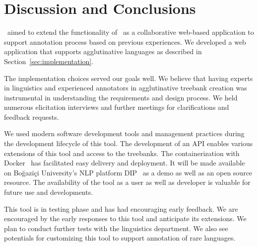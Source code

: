 \section{Discussion and Conclusions}
\label{sec:discussion}

\boatvtwo\ aimed to  extend the functionality of \boatvone\ as a collaborative web-based application to support annotation process based on previous experiences. 
We developed a web application that supports agglutinative languages as described in Section~\ref{sec:implementation}. 

The implementation choices served our goals well. 
We believe that having experts in linguistics and experienced annotators in agglutinative treebank creation was instrumental in understanding the requirements and design process. 
We held numerous elicitation interviews and further meetings for clarifications and feedback requests.

We used modern software development tools and management practices during the development lifecycle of this tool.
The development of an API enables various extensions of this tool and access to the treebanks.  
The containerization with Docker~\cite{docker} has facilitated easy delivery and deployment.
It will be made available on Boğaziçi University's NLP platform DIP~\cite{DIP} as a demo as well as an open source resource.
The availability of the tool as a user as well as developer is valuable for future use and developments. 

This tool is in testing phase and has had encouraging early feedback.
We are encouraged by the early responses to this tool and anticipate its extensions.
We plan to conduct further tests with the linguistics department. 
We also see potentials for customizing this tool to support annotation of rare languages.
